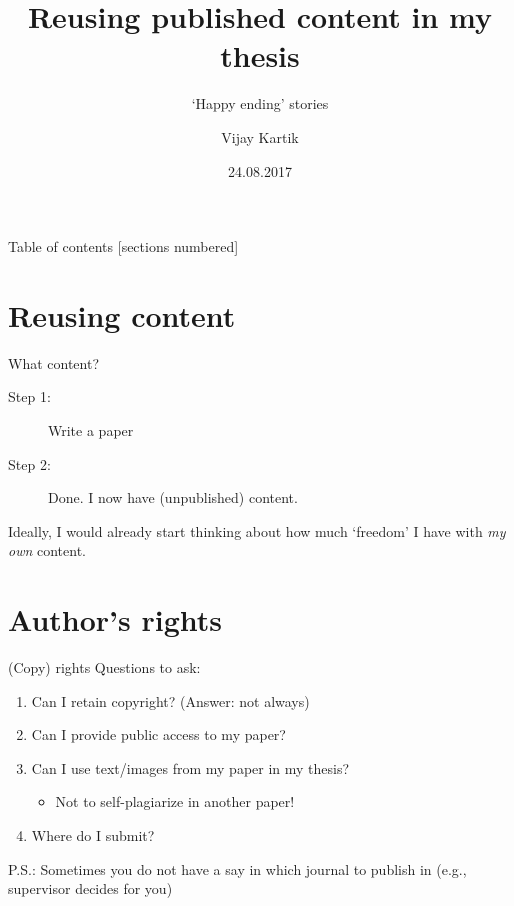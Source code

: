 \documentclass[10pt]{beamer}
\title{Reusing published content in my thesis}
\subtitle{`Happy ending' stories}
\date{24.08.2017}
\author{Vijay Kartik}
\institute{Noon Talk, EPFL Library}
\begin{document}
\maketitle

\begin{frame}{Table of contents}
  [sections numbered]
  \tableofcontents[hideallsubsections]
\end{frame}

\section{Reusing content}

\begin{frame}[fragile]{What content?}
  \begin{description}
  \item[Step 1:] Write a paper
  \item[Step 2:] Done. I now have (unpublished) content.
  \end{description}
  \vspace{1in}
Ideally, I would already start thinking about how much `freedom' I have with \emph{my own} content.
\end{frame}

\section{Author's rights}

\begin{frame}[fragile]{(Copy) rights}
  Questions to ask:
  \begin{enumerate}
  \item Can I retain copyright? (Answer: \alert{not always})
  \item Can I provide public access to my paper?
  \item Can I use text/images from my paper in my thesis?
  	\begin{itemize}
  		\item Not to self-plagiarize in another paper!
  	\end{itemize}
  \item Where do I submit?
  \end{enumerate}
  P.S.: Sometimes you do not have a say in which journal to publish in (e.g., supervisor decides for you)
\end{frame}
\end{document}
